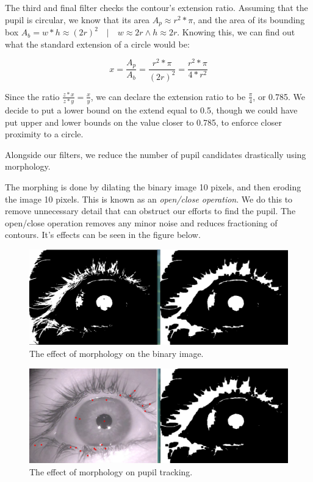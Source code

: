 The third and final filter checks the contour's extension ratio. Assuming that the pupil is circular, we know that its area \(A_p \approx r^2*\pi\), and the area of its bounding box \(A_b = w*h \approx (2r)^2 \quad | \quad w \approx 2r \wedge h \approx 2r\). Knowing this, we can find out what the standard extension of a circle would be:

\[x = \frac{A_p}{A_b} = \frac{r^2*\pi}{(2r)^2} = \frac{r^2*\pi}{4*r^2}\]

Since the ratio \(\frac{z*x}{z*y} = \frac{x}{y}\), we can declare the extension ratio to be \(\frac{\pi}{4}\), or 0.785. We decide to put a lower bound on the extend equal to 0.5, though we could have put upper and lower bounds on the value closer to 0.785, to enforce closer proximity to a circle.
\newline

Alongside our filters, we reduce the number of pupil candidates drastically using morphology.\newline

The morphing is done by dilating the binary image 10 pixels, and then eroding the image 10 pixels. This is known as an \emph{open/close operation}. We do this to remove unnecessary detail that can obstruct our efforts to find the pupil. The open/close operation removes any minor noise and reduces fractioning of contours. It's effects can be seen in the figure below.\newline

\begin{figure}[h]
	\centering
	\includegraphics[scale=0.3]{morphology.png}
	\caption{The effect of morphology on the binary image.}
\end{figure}
\begin{figure}[h]
	\centering
	\includegraphics[scale=0.3]{morphology_results.png}
		\caption{The effect of morphology on pupil tracking.}
\end{figure}

